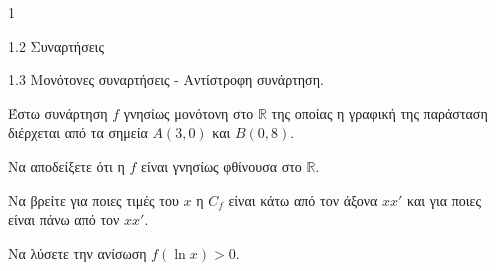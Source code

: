 \begin{ylh}{1}
    \item 1.2 Συναρτήσεις
    \item 1.3 Μονότονες συναρτήσεις - Αντίστροφη συνάρτηση.
\end{ylh}
Έστω συνάρτηση $f$ γνησίως μονότονη στο $\mathbb{R}$ της οποίας η γραφική της παράσταση διέρχεται από τα σημεία $A(3,0)$ και $B(0,8)$.
\begin{alist}
\item Να αποδείξετε ότι η $f$ είναι γνησίως φθίνουσα στο $\mathbb{R}$. 
\item Να βρείτε για ποιες τιμές του $x$ η $C_f$ είναι κάτω από τον άξονα $xx'$ και για ποιες είναι πάνω από τον $xx'$. 
\item Να λύσετε την ανίσωση $f(\ln x) > 0$. 
\end{alist}